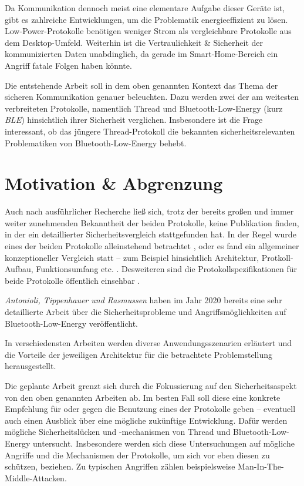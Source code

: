 \documentclass{article}
\begin{document}
Da Kommunikation dennoch meist eine elementare Aufgabe dieser Geräte ist, gibt
es zahlreiche Entwicklungen, um die Problematik energieeffizient zu lösen.
Low-Power-Protokolle benötigen weniger Strom als vergleichbare Protokolle aus
dem Desktop-Umfeld. Weiterhin ist die Vertraulichkeit \& Sicherheit der
kommunizierten Daten unabdinglich, da gerade im Smart-Home-Bereich ein Angriff
fatale Folgen haben könnte.

Die entstehende Arbeit soll in dem oben genannten Kontext das Thema der
sicheren Kommunikation genauer beleuchten. Dazu werden zwei der am weitesten
verbreiteten Protokolle, namentlich Thread und Bluetooth-Low-Energy (kurz
\textit{BLE}) hinsichtlich ihrer Sicherheit verglichen. Insbesondere ist die
Frage interessant, ob das jüngere Thread-Protokoll die bekannten
sicherheitsrelevanten Problematiken von Bluetooth-Low-Energy behebt.

\section{Motivation \& Abgrenzung}

Auch nach ausführlicher Recherche ließ sich, trotz der bereits großen und immer
weiter zunehmenden Bekanntheit der beiden Protokolle, keine Publikation finden,
in der ein detaillierter Sicherheitsvergleich stattgefunden hat. In der Regel
wurde eines der beiden Protokolle alleinstehend betrachtet
\parencite{ThreadInteroperabilityIEEE, BluetoothMeshIntroBLTW:online}, oder es
fand ein allgemeiner konzeptioneller Vergleich statt – zum Beispiel
hinsichtlich Architektur, Protkoll-Aufbau, Funktionsumfang etc.
\parencite{ThreadMeshVsOtherWirelessIEEE, ComparativeAnalysisIEEE,
ThreadVsBluetoothEnterpriseIotInsights:online}. Desweiteren sind die
Protokollspezifikationen für beide Protokolle öffentlich einsehbar
\parencite{ThreadSpec:online, BluetoothSpec:online}.

\textit{Antonioli, Tippenhauer und Rasmussen} haben im Jahr 2020 bereits eine
sehr detaillierte Arbeit über die Sicherheitsprobleme und Angriffsmöglichkeiten
auf Bluetooth-Low-Energy veröffentlicht.
\parencite{BluetoothLowEnergyAttackOxford}

In verschiedensten Arbeiten werden diverse Anwendungsszenarien erläutert und
die Vorteile der jeweiligen Architektur für die betrachtete Problemstellung
herausgestellt. \parencite{ThreadApplicationIEEE,
ThreadApplicationSmartBuildingsIEEE}

Die geplante Arbeit grenzt sich durch die Fokussierung auf den
Sicherheitsaspekt von den oben genannten Arbeiten ab. Im besten Fall soll diese
eine konkrete Empfehlung für oder gegen die Benutzung eines der Protokolle
geben – eventuell auch einen Ausblick über eine mögliche zukünftige
Entwicklung. Dafür werden mögliche Sicherheitslücken und -mechanismen von
Thread und Bluetooth-Low-Energy untersucht. Insbesondere werden sich diese
Untersuchungen auf mögliche Angriffe und die Mechanismen der Protokolle, um
sich vor eben diesen zu schützen, beziehen.
\parencite{BluetoothPracticalAttacksICACCS, ThreadSecurityCSIAC:online} Zu
typischen Angriffen zählen beispielsweise Man-In-The-Middle-Attacken.
\parencite{GeneralManInTheMiddle}
\end{document}
